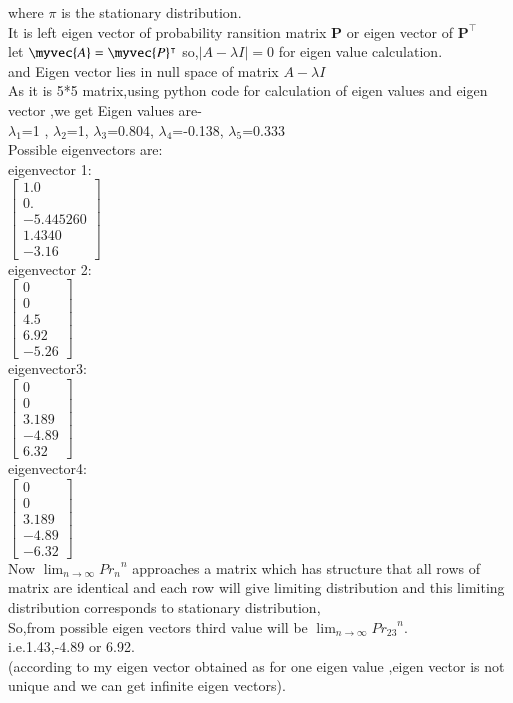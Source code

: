 \documentclass[journel,12pt,twocoloums]{IEEEtran}
\begin{document}
where $\pi$ is the stationary distribution.\\
It is left eigen vector of probability ransition matrix $\mathbf{P}$ or eigen vector of $\mathbf{P}^ \intercal$\\
let $\myvec{A}=\myvec{P}^\intercal$
so,$|A-\lambda I|=0$ for eigen value calculation.\\
and Eigen vector lies in null space of matrix $A-\lambda I$\\
As it is 5*5 matrix,using python code for calculation of eigen values and eigen vector ,we get
Eigen values are-\\
$\lambda_1$=1 , $\lambda_2$=1, $\lambda_3$=0.804, $\lambda_4$=-0.138, $\lambda_5$=0.333\\
Possible eigenvectors are: \\
eigenvector 1:\\
\begin{math}
\left[
\begin{array}{c}
     1.0\\
     0.\\
     -5.445260\\
     1.4340\\
      -3.16
\end{array}\right]
\end{math}
\\
 eigenvector 2:\\
\begin{math}
\left[
\begin{array}{c}
      0\\
      0\\
      4.5\\
      6.92\\
      -5.26
\end{array}\right]
\end{math}
\\
eigenvector3:\\
\begin{math}
\left[
\begin{array}{c}
      0\\
      0\\
      3.189\\
      -4.89\\
      6.32
\end{array}\right]
\end{math}
\\
eigenvector4:\\
\begin{math}
\left[
\begin{array}{c}
      0\\
      0\\
      3.189\\
      -4.89\\
      -6.32
\end{array}\right]
\end{math}
\\
Now $\lim_{n \to \infty } {Pr_{n}}^n$ approaches a matrix which has structure that all rows of matrix are identical and each row will give limiting distribution and this limiting distribution corresponds to stationary distribution,\\

So,from possible eigen vectors third value will be $\lim_{n \to \infty } {Pr_{23}}^n$.
\\
i.e.1.43,-4.89 or 6.92.\\ (according to my eigen vector obtained as for one eigen value ,eigen vector is not unique and we can get infinite eigen vectors).
\end{document}
